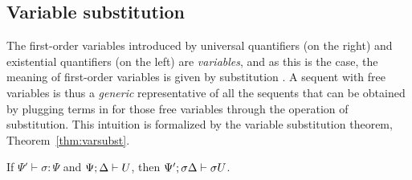 \subsection{Variable substitution}

The first-order variables introduced by universal quantifiers (on the
right) and existential quantifiers (on the left) are {\it variables},
and as this is the case, the meaning of first-order variables is given
by substitution \cite[Chapter 1]{harper12practical}. A sequent with
free variables is thus a {\it generic} representative of all the
sequents that can be obtained by plugging terms in for those free
variables through the operation of substitution. This intuition is
formalized by the variable substitution theorem,
Theorem~\ref{thm:varsubst}.

\bigskip
\begin{theorem}
\label{thm:varsubst}
If $\Psi' \vdash \sigma : \Psi$ and ${\Psi};{\Delta} \vdash {U}$, then 
${\Psi'};{\sigma\Delta} \vdash {\sigma{U}}$.
\end{theorem}

